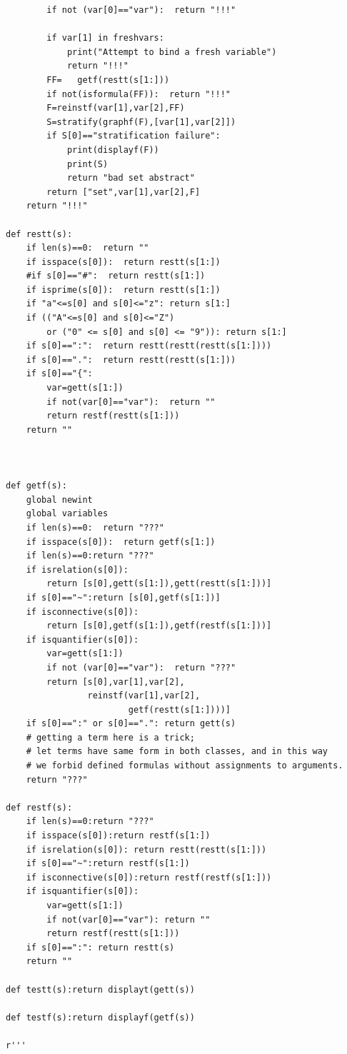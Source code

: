 \documentclass{article}
\begin{document}
\begin{verbatim}
        if not (var[0]=="var"):  return "!!!"

        if var[1] in freshvars:
            print("Attempt to bind a fresh variable")
            return "!!!"
        FF=   getf(restt(s[1:]))
        if not(isformula(FF)):  return "!!!"
        F=reinstf(var[1],var[2],FF)
        S=stratify(graphf(F),[var[1],var[2]])
        if S[0]=="stratification failure":
            print(displayf(F))
            print(S)
            return "bad set abstract"
        return ["set",var[1],var[2],F]
    return "!!!"

def restt(s):
    if len(s)==0:  return ""
    if isspace(s[0]):  return restt(s[1:])
    #if s[0]=="#":  return restt(s[1:])
    if isprime(s[0]):  return restt(s[1:])
    if "a"<=s[0] and s[0]<="z": return s[1:]
    if (("A"<=s[0] and s[0]<="Z")
        or ("0" <= s[0] and s[0] <= "9")): return s[1:]
    if s[0]==":":  return restt(restt(restt(s[1:])))
    if s[0]==".":  return restt(restt(s[1:]))
    if s[0]=="{":
        var=gett(s[1:])
        if not(var[0]=="var"):  return ""
        return restf(restt(s[1:]))
    return ""



def getf(s):
    global newint
    global variables
    if len(s)==0:  return "???"
    if isspace(s[0]):  return getf(s[1:])
    if len(s)==0:return "???"
    if isrelation(s[0]):
        return [s[0],gett(s[1:]),gett(restt(s[1:]))]
    if s[0]=="~":return [s[0],getf(s[1:])]
    if isconnective(s[0]):
        return [s[0],getf(s[1:]),getf(restf(s[1:]))]
    if isquantifier(s[0]):
        var=gett(s[1:])
        if not (var[0]=="var"):  return "???"
        return [s[0],var[1],var[2],
                reinstf(var[1],var[2],
                        getf(restt(s[1:])))]
    if s[0]==":" or s[0]==".": return gett(s)
    # getting a term here is a trick;
    # let terms have same form in both classes, and in this way
    # we forbid defined formulas without assignments to arguments.
    return "???"

def restf(s):
    if len(s)==0:return "???"
    if isspace(s[0]):return restf(s[1:])
    if isrelation(s[0]): return restt(restt(s[1:]))
    if s[0]=="~":return restf(s[1:])
    if isconnective(s[0]):return restf(restf(s[1:]))
    if isquantifier(s[0]):
        var=gett(s[1:])
        if not(var[0]=="var"): return ""
        return restf(restt(s[1:]))
    if s[0]==":": return restt(s)
    return ""

def testt(s):return displayt(gett(s))

def testf(s):return displayf(getf(s))

r'''
\end{verbatim}
\end{document}
